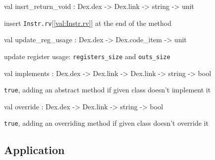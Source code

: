 \documentclass[11pt]{article}
\begin{document}
\label{val:Modify.insrt-underscorereturn-underscorevoid}\begin{ocamldoccode}
val insrt_return_void : Dex.dex -> Dex.link -> string -> unit
\end{ocamldoccode}
\begin{ocamldocdescription}
insert {\tt{Instr.rv}}[\ref{val:Instr.rv}] at the end of the method


\end{ocamldocdescription}




\label{val:Modify.update-underscorereg-underscoreusage}\begin{ocamldoccode}
val update_reg_usage : Dex.dex -> Dex.code_item -> unit
\end{ocamldoccode}
\begin{ocamldocdescription}
update register usage: {\tt{registers\_size}} and {\tt{outs\_size}}


\end{ocamldocdescription}




\label{val:Modify.implements}\begin{ocamldoccode}
val implements : Dex.dex -> Dex.link -> Dex.link -> string -> bool
\end{ocamldoccode}
\begin{ocamldocdescription}
{\tt{true}}, adding an abstract method if given class doesn't implement it


\end{ocamldocdescription}




\label{val:Modify.override}\begin{ocamldoccode}
val override : Dex.dex -> Dex.link -> string -> bool
\end{ocamldoccode}
\begin{ocamldocdescription}
{\tt{true}}, adding an overriding method if given class doesn't override it


\end{ocamldocdescription}




\subsection{Application}
\end{document}
